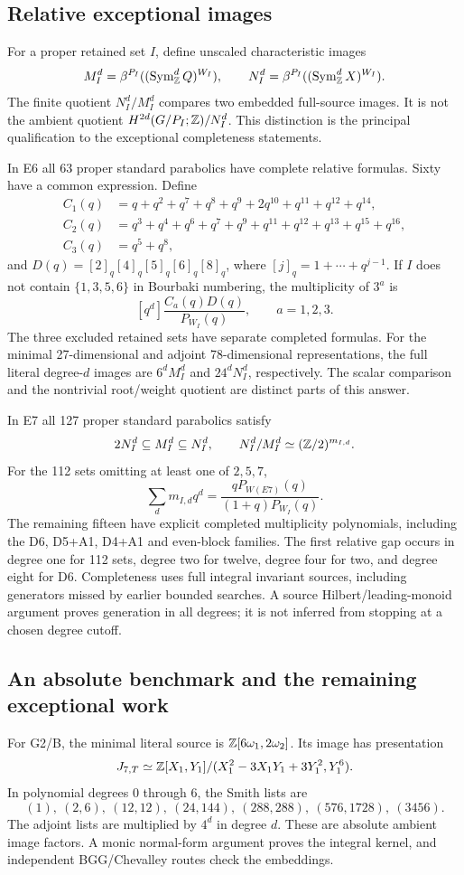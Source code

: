 \subsection{Relative exceptional images}
For a proper retained set $I$, define unscaled characteristic images
\[
 M_I^d=\beta^{P_I}((\operatorname{Sym}_\mathbb Z^dQ)^{W_I}),\qquad
 N_I^d=\beta^{P_I}((\operatorname{Sym}_\mathbb Z^dX)^{W_I}).
\]
The finite quotient $N_I^d/M_I^d$ compares two embedded full-source images. It is not the ambient quotient $H^{2d}(G/P_I;\mathbb Z)/N_I^d$. This distinction is the principal qualification to the exceptional completeness statements.

In E6 all 63 proper standard parabolics have complete relative formulas. Sixty have a common expression. Define
\begin{align*}
 C_1(q)&=q+q^2+q^7+q^8+q^9+2q^{10}+q^{11}+q^{12}+q^{14},\\
 C_2(q)&=q^3+q^4+q^6+q^7+q^9+q^{11}+q^{12}+q^{13}+q^{15}+q^{16},\\
 C_3(q)&=q^5+q^8,
\end{align*}
and $D(q)=[2]_q[4]_q[5]_q[6]_q[8]_q$, where $[j]_q=1+\cdots+q^{j-1}$. If $I$ does not contain $\{1,3,5,6\}$ in Bourbaki numbering, the multiplicity of $3^a$ is
\[
 [q^d]\frac{C_a(q)D(q)}{P_{W_I}(q)},\qquad a=1,2,3.
\]
The three excluded retained sets have separate completed formulas. For the minimal 27-dimensional and adjoint 78-dimensional representations, the full literal degree-$d$ images are $6^dM_I^d$ and $24^dN_I^d$, respectively. The scalar comparison and the nontrivial root/weight quotient are distinct parts of this answer.

In E7 all 127 proper standard parabolics satisfy
\[
 2N_I^d\subseteq M_I^d\subseteq N_I^d,\qquad
 N_I^d/M_I^d\simeq(\mathbb Z/2)^{m_{I,d}}.
\]
For the 112 sets omitting at least one of $2,5,7$,
\[
 \sum_d m_{I,d}q^d=\frac{qP_{W(E7)}(q)}{(1+q)P_{W_I}(q)}.
\]
The remaining fifteen have explicit completed multiplicity polynomials, including the D6, D5+A1, D4+A1 and even-block families. The first relative gap occurs in degree one for 112 sets, degree two for twelve, degree four for two, and degree eight for D6. Completeness uses full integral invariant sources, including generators missed by earlier bounded searches. A source Hilbert/leading-monoid argument proves generation in all degrees; it is not inferred from stopping at a chosen degree cutoff.

\subsection{An absolute benchmark and the remaining exceptional work}
For G2/B, the minimal literal source is $\mathbb Z[6\omega_1,2\omega_2]$. Its image has presentation
\[
 J_{7,T}\simeq\mathbb Z[X_1,Y_1]/(X_1^2-3X_1Y_1+3Y_1^2,Y_1^6).
\]
In polynomial degrees $0$ through $6$, the Smith lists are
\[
 (1),\ (2,6),\ (12,12),\ (24,144),\ (288,288),\ (576,1728),\ (3456).
\]
The adjoint lists are multiplied by $4^d$ in degree $d$. These are absolute ambient image factors. A monic normal-form argument proves the integral kernel, and independent BGG/Chevalley routes check the embeddings.

